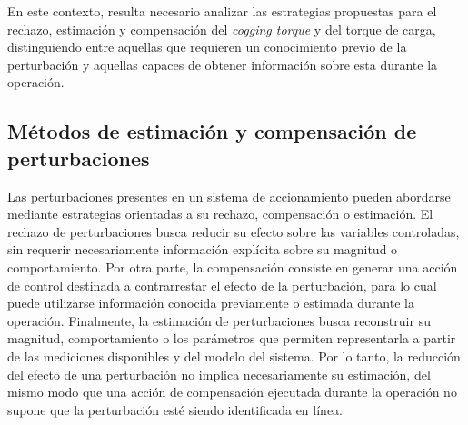 En este contexto, resulta necesario analizar las estrategias propuestas para
el rechazo, estimación y compensación del \textit{cogging torque} y del torque
de carga, distinguiendo entre aquellas que requieren un conocimiento previo
de la perturbación y aquellas capaces de obtener información sobre esta
durante la operación.



\subsection{Métodos de estimación y compensación de perturbaciones}


%
%
%
%
%
%
%
%
%

Las perturbaciones presentes en un sistema de accionamiento pueden abordarse mediante estrategias orientadas a su rechazo, compensación o estimación. El rechazo de perturbaciones busca reducir su efecto sobre las variables controladas, sin requerir necesariamente información explícita sobre su magnitud o comportamiento. Por otra parte, la compensación consiste en generar una acción de control destinada a contrarrestar el efecto de la perturbación, para lo cual puede utilizarse información conocida previamente o estimada durante la operación. Finalmente, la estimación de perturbaciones busca reconstruir su magnitud, comportamiento o los parámetros que permiten representarla a partir de las mediciones disponibles y del modelo del sistema. Por lo tanto, la reducción del efecto de una perturbación no implica necesariamente su estimación, del mismo modo que una acción de compensación ejecutada durante la operación no supone que la perturbación esté siendo identificada en línea.


